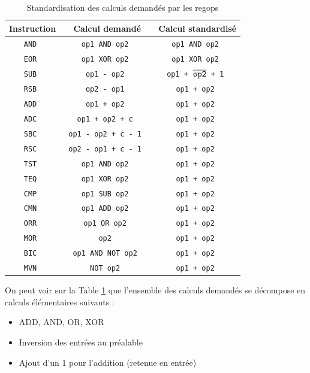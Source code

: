 \documentclass{article}
\begin{document}
\begin{table}[H]
\centering
\begingroup
\setlength{\tabcolsep}{5pt}
\renewcommand{\arraystretch}{1.1}
\begin{tabular}{ | c | c | c | }
\hline
Instruction & Calcul demandé & Calcul standardisé  \\
\hline
\tt{AND}      & \tt{ op1 AND op2 }                 & \tt{ op1 AND op2 } \\
\hline
\tt{EOR}      & \tt{ op1 XOR op2 }                 & \tt{ op1 XOR op2 }       \\
\hline
\tt{SUB}      & \tt{ op1 - op2 }                   & \tt{ op1 + $\overline{\tt{op2}}$ + 1 }       \\
\hline
\tt{RSB}      & \tt{ op2 - op1 }                   & \tt{ op1 + op2 }       \\
\hline
\tt{ADD}      & \tt{ op1 + op2 }                   & \tt{ op1 + op2 }       \\
\hline
\tt{ADC}      & \tt{ op1 + op2 + c }               & \tt{ op1 + op2 }       \\
\hline
\tt{SBC}      & \tt{ op1 - op2 + c - 1 }           & \tt{ op1 + op2 }       \\
\hline
\tt{RSC}      & \tt{ op2 - op1 + c - 1 }           & \tt{ op1 + op2 }       \\
\hline
\tt{TST}      & \tt{ op1 AND op2 }                 & \tt{ op1 + op2 }       \\
\hline
\tt{TEQ}      & \tt{ op1 XOR op2 }                 & \tt{ op1 + op2 }       \\
\hline
\tt{CMP}      & \tt{ op1 SUB op2 }                 & \tt{ op1 + op2 }       \\
\hline
\tt{CMN}      & \tt{ op1 ADD op2 }                 & \tt{ op1 + op2 }       \\
\hline
\tt{ORR}      & \tt{ op1 OR op2 }                  & \tt{ op1 + op2 }       \\
\hline
\tt{MOR}      & \tt{ op2 }                         & \tt{ op1 + op2 }       \\
\hline
\tt{BIC}      & \tt{ op1 AND NOT op2 }             & \tt{ op1 + op2 }       \\
\hline
\tt{MVN}      & \tt{ NOT op2 }                     & \tt{ op1 + op2 }       \\
\hline
\end{tabular}
\endgroup
\caption{Standardisation des calculs demandés par les regops}
\label{standard}
\end{table}

On peut voir sur la Table \ref{standard} que l'ensemble des calculs demandés se décompose
en calculs élémentaires suivants :
\begin{itemize}
  \item ADD, AND, OR, XOR
  \item Inversion des entrées au préalable
  \item Ajout d'un 1 pour l'addition (retenue en entrée)
\end{itemize}
\end{document}
